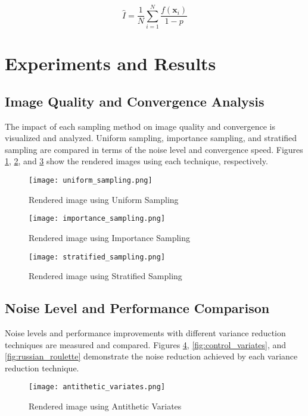 \documentclass[12pt]{article}
\begin{document}
\begin{equation}
    \hat{I} = \frac{1}{N} \sum_{i=1}^{N} \frac{f(\mathbf{x}_i)}{1 - p}
\end{equation}

\section{Experiments and Results}
\label{sec:experiments}
\subsection{Image Quality and Convergence Analysis}
The impact of each sampling method on image quality and convergence is visualized and analyzed. Uniform sampling, importance sampling, and stratified sampling are compared in terms of the noise level and convergence speed. Figures \ref{fig:uniform_sampling}, \ref{fig:importance_sampling}, and \ref{fig:stratified_sampling} show the rendered images using each technique, respectively.

\begin{figure}[h]
    \centering
    \texttt{[image: uniform\_sampling.png]}
    \caption{Rendered image using Uniform Sampling}
    \label{fig:uniform_sampling}
\end{figure}

\begin{figure}[h]
    \centering
    \texttt{[image: importance\_sampling.png]}
    \caption{Rendered image using Importance Sampling}
    \label{fig:importance_sampling}
\end{figure}

\begin{figure}[h]
    \centering
    \texttt{[image: stratified\_sampling.png]}
    \caption{Rendered image using Stratified Sampling}
    \label{fig:stratified_sampling}
\end{figure}

\subsection{Noise Level and Performance Comparison}
Noise levels and performance improvements with different variance reduction techniques are measured and compared. Figures \ref{fig:antithetic_variates}, \ref{fig:control_variates}, and \ref{fig:russian_roulette} demonstrate the noise reduction achieved by each variance reduction technique.

\begin{figure}[h]
    \centering
    \texttt{[image: antithetic\_variates.png]}
    \caption{Rendered image using Antithetic Variates}
    \label{fig:antithetic_variates}
\end{figure}
\end{document}
